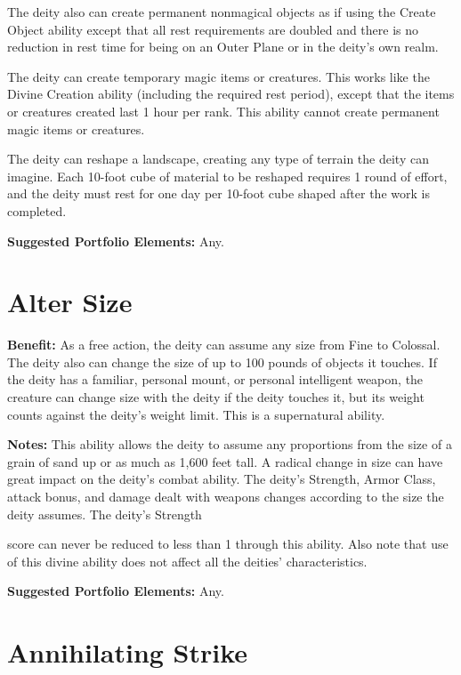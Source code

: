 \documentclass{article}
\begin{document}
The deity also can create permanent nonmagical objects as if using the Create Object 
ability except that all rest requirements are doubled and there is no reduction 
in rest time for being on an Outer Plane or in the deity's own realm. 

The deity can create temporary magic items or creatures. This works like the Divine 
Creation ability (including the required rest period), except that the items or 
creatures created last 1 hour per rank. This ability cannot create permanent magic 
items or creatures. 

The deity can reshape a landscape, creating any type of terrain the deity can imagine. 
Each 10-foot cube of material to be reshaped requires 1 round of effort, and the 
deity must rest for one day per 10-foot cube shaped after the work is completed.

\textbf{Suggested Portfolio Elements:} Any.

\vspace{12pt}
\section*{Alter Size}

\textbf{Benefit:} As a free action, the deity can assume any size from Fine to 
Colossal. The deity also can change the size of up to 100 pounds of objects it 
touches. If the deity has a familiar, personal mount, or personal intelligent weapon, 
the creature can change size with the deity if the deity touches it, but its weight 
counts against the deity's weight limit. This is a supernatural ability.

\textbf{Notes:} This ability allows the deity to assume any proportions from the 
size of a grain of sand up or as much as 1,600 feet tall. A radical change in size 
can have great impact on the deity's combat ability. The deity's Strength, Armor 
Class, attack bonus, and damage dealt with weapons changes according to the size 
the deity assumes. The deity's Strength

score can never be reduced to less than 1 through this ability. Also note that 
use of this divine ability does not affect all the deities' characteristics.

\textbf{Suggested Portfolio Elements:} Any.

\vspace{12pt}
\section*{Annihilating Strike}
\end{document}
